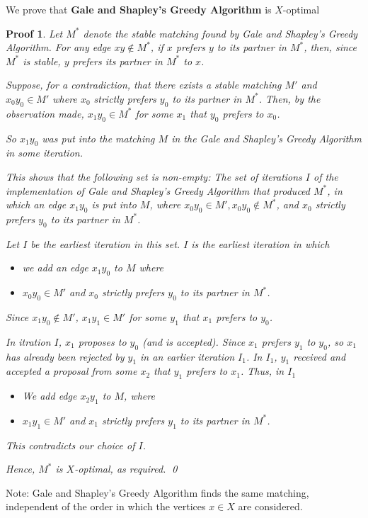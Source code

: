 \documentclass[twoside]{article}
\newtheorem{protoproof}[prototheorem]{Proof}
\renewenvironment{proof}
{\colorlet{shadecolor}{blue!15}\begin{shaded}\begin{protoproof}
		\normalfont}
		{\qed\end{protoproof}\end{shaded}}
\begin{document}
We prove that \textbf{Gale and Shapley's Greedy Algorithm} is $X$-optimal
\begin{proof}
	Let $M^*$ denote the stable matching found by Gale and Shapley's Greedy Algorithm. For any edge $xy \notin M^*$, if $x$ prefers $y$ to its partner in $M^*$, then, since $M^*$ is stable, $y$ prefers its partner in $M^*$ to $x$. 
			
	Suppose, for a contradiction, that there exists a stable matching $M'$ and $x_0y_0 \in M'$ where $x_0$ strictly prefers $y_0$ to its partner in $M^*$. Then, by the observation made, $x_1y_0 \in M^*$ for some $x_1$ that $y_0$ prefers to $x_0$. 
			
	So $x_1y_0$ was put into the matching $M$ in the Gale and Shapley's Greedy Algorithm in some iteration. 
			
	This shows that the following set is non-empty: The set of iterations $I$ of the implementation of Gale and Shapley's Greedy Algorithm that produced $M^*$, in which an edge $x_1y_0$ is put into $M$, where $x_0y_0 \in M', x_0y_0 \notin M^*$, and $x_0$ strictly prefers $y_0$ to its partner in $M^*$. 
			
	Let $I$ be the earliest iteration in this set. $I$ is the earliest iteration in which \begin{itemize}
	\item we add an edge $x_1y_0$ to $M$ where
	\item $x_0y_0 \in M'$ and $x_0$ strictly prefers $y_0$ to its partner in $M^*$. 
	\end{itemize}
	Since $x_1y_0 \notin M'$, $x_1y_1\in M'$ for some $y_1$ that $x_1$ prefers to $y_0$. 
		
	In itration $I$, $x_1$ proposes to $y_0$ (and is accepted). Since $x_1$ prefers $y_1$ to $y_0$, so $x_1$ has already been rejected by $y_1$ in an earlier iteration $I_1$. In $I_1$, $y_1$ received and accepted a proposal from some $x_2$ that $y_1$ prefers to $x_1$. Thus, in $I_1$\begin{itemize}
	\item We add edge $x_2y_1$ to $M$, where
	\item $x_1y_1 \in M'$ and $x_1$ strictly prefers $y_1$ to its partner in $M^*$. 
	\end{itemize}
	This contradicts our choice of $I$. 
		
	Hence, $M^*$ is $X$-optimal, as required. 
\end{proof}

Note: Gale and Shapley's Greedy Algorithm finds the same matching, independent of the order in which the vertices $x \in X$ are considered. 
\end{document}
